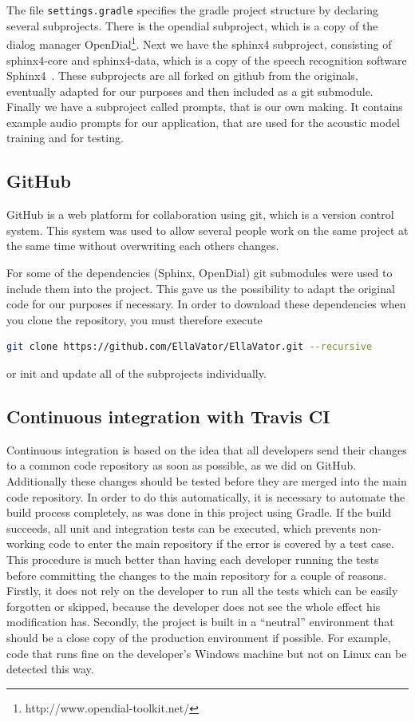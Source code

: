 \documentclass[a4paper, 12pt]{article}
\begin{document}
The file \texttt{settings.gradle} specifies the gradle project structure by declaring several subprojects.
There is the opendial subproject, which is a copy of the dialog manager OpenDial\footnote{http://www.opendial-toolkit.net/}.
Next we have the sphinx4 subproject, consisting of sphinx4-core and sphinx4-data, which is a copy of the speech recognition software Sphinx4~\cite{Walker:2004:SFO:1698193}.
These subprojects are all forked on github from the originals, eventually adapted for our purposes and then included as a git submodule.
Finally we have a subproject called prompts, that is our own making.
It contains example audio prompts for our application, that are used for the acoustic model training and for testing.

\subsection{GitHub}
GitHub is a web platform for collaboration using git, which is a version control system. 
This system was used to allow several people work on the same project at the same time without overwriting each others changes.

For some of the dependencies (Sphinx, OpenDial) git submodules were used to include them into the project. 
This gave us the possibility to adapt the original code for our purposes if necessary.
In order to download these dependencies when you clone the repository, you must therefore execute
\begin{lstlisting}[language=bash]
git clone https://github.com/EllaVator/EllaVator.git --recursive
\end{lstlisting}
or init and update all of the subprojects individually.
\subsection{Continuous integration with Travis CI}

Continuous integration is based on the idea that all developers send their changes to a common code repository as soon as possible, as we did on GitHub. 
Additionally these changes should be tested before they are merged into the main code repository. 
In order to do this automatically, it is necessary to automate the build process completely, as was done in this project  using Gradle.
If the build succeeds, all unit and integration tests can be executed, which prevents non-working code to enter the main repository if the error is covered by a test case.
This procedure is much better than having each developer running the tests before committing the changes to the main repository for a couple of reasons.
Firstly, it does not rely on the developer to run all the tests which can be easily forgotten or skipped, because the developer does not see the whole effect his modification has.
Secondly, the project is built in a “neutral” environment that should be a close copy of the production environment if possible. 
For example, code that runs fine on the developer's Windows machine but not on Linux can be detected this way.
\end{document}
